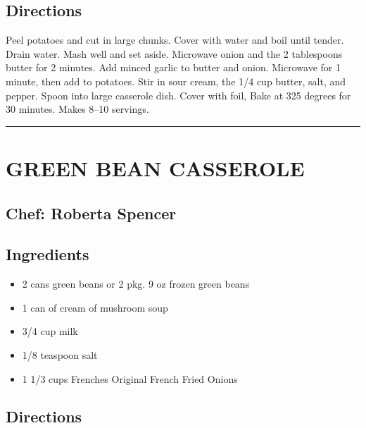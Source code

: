 \documentclass[
]{book}
\providecommand{\tightlist}{%
  \setlength{\itemsep}{0pt}\setlength{\parskip}{0pt}}
\begin{document}
\hypertarget{directions-30}{%
\subsection*{Directions}\label{directions-30}}


Peel potatoes and cut in large chunks. Cover with water and boil until tender. Drain water. Mash well and set aside. Microwave onion and the 2 tablespoons butter for 2 minutes. Add minced garlic to butter and onion. Microwave for 1 minute, then add to potatoes. Stir in sour cream, the 1/4 cup butter, salt, and pepper. Spoon into large casserole dish. Cover with foil, Bake at 325 degrees for 30 minutes. Makes 8--10 servings.

\begin{center}\rule{0.5\linewidth}{0.5pt}\end{center}

\hypertarget{green-bean-casserole}{%
\section*{GREEN BEAN CASSEROLE}\label{green-bean-casserole}}


\hypertarget{chef-roberta-spencer-6}{%
\subsection*{Chef: Roberta Spencer}\label{chef-roberta-spencer-6}}


\hypertarget{ingredients-31}{%
\subsection*{Ingredients}\label{ingredients-31}}


\begin{itemize}
\tightlist
\item
  2 cans green beans or 2 pkg. 9 oz frozen green beans
\item
  1 can of cream of mushroom soup
\item
  3/4 cup milk
\item
  1/8 teaspoon salt
\item
  1 1/3 cups Frenches Original French Fried Onions
\end{itemize}

\hypertarget{directions-31}{%
\subsection*{Directions}\label{directions-31}}
\end{document}

